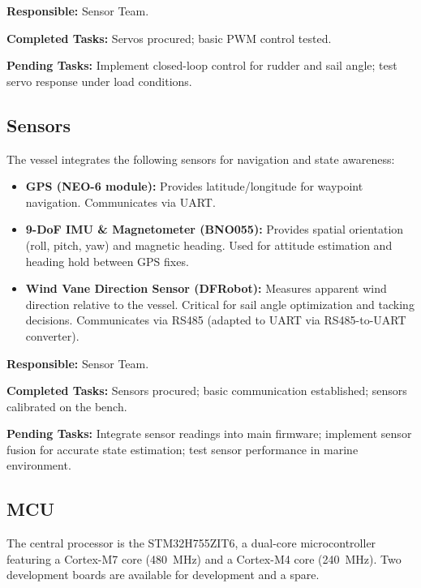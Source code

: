 \textbf{Responsible:} Sensor Team.

\textbf{Completed Tasks:} Servos procured; basic PWM control tested.

\textbf{Pending Tasks:} Implement closed-loop control for rudder and sail angle; test servo response under load conditions.


\subsection{Sensors}

The vessel integrates the following sensors for navigation and state awareness:

\begin{itemize}
    \item \textbf{GPS (NEO-6 module):} Provides latitude/longitude for waypoint navigation. Communicates via UART.
    \item \textbf{9-DoF IMU \& Magnetometer (BNO055):} Provides spatial orientation (roll, pitch, yaw) and magnetic heading. Used for attitude estimation and heading hold between GPS fixes.
    \item \textbf{Wind Vane Direction Sensor (DFRobot):} Measures apparent wind direction relative to the vessel. Critical for sail angle optimization and tacking decisions. Communicates via RS485 (adapted to UART via RS485-to-UART converter).
\end{itemize}

\textbf{Responsible:} Sensor Team.

\textbf{Completed Tasks:} Sensors procured; basic communication established; sensors calibrated on the bench.

\textbf{Pending Tasks:} Integrate sensor readings into main firmware; implement sensor fusion for accurate state estimation; test sensor performance in marine environment.


\subsection{MCU}

The central processor is the STM32H755ZIT6, a dual-core microcontroller featuring a Cortex-M7 core (480~MHz) and a Cortex-M4 core (240~MHz). Two development boards are available for development and a spare.

